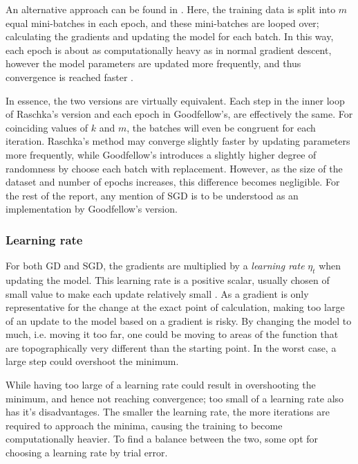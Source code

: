 An alternative approach can be found in \textcite[p. 47]{raschka}.
Here, the training data is split into $m$ equal mini-batches in each epoch, and these mini-batches are looped over; calculating the gradients and updating the model for each batch.
In this way, each epoch is about as computationally heavy as in normal gradient descent, however the model parameters are updated more frequently, and thus convergence is reached faster \citep[p. 47]{raschka}.

In essence, the two versions are virtually equivalent. Each step in the inner loop of Raschka's version and each epoch in Goodfellow's, are effectively the same. For coinciding values of $k$ and $m$, the batches will even be congruent for each iteration. Raschka's method may converge slightly faster by updating parameters more frequently, while Goodfellow's introduces a slightly higher degree of randomness by choose each batch with replacement. However, as the size of the dataset and number of epochs increases, this difference becomes negligible.
For the rest of the report, any mention of SGD is to be understood as an implementation by Goodfellow's version.

\subsubsection{Learning rate}
For both GD and SGD, the gradients are multiplied by a \textit{learning rate} $\eta_t$ when updating the model.
This learning rate is a positive scalar, usually chosen of small value to make each update relatively small \citep[p. 84]{Goodfellow-et-al-2016}.
As a gradient is only representative for the change at the exact point of calculation, making too large of an update to the model based on a gradient is risky. By changing the model to much, i.e. moving it too far, one could be moving to areas of the function that are topographically very different than the starting point. In the worst case, a large step could overshoot the minimum.

While having too large of a learning rate could result in overshooting the minimum, and hence not reaching convergence; too small of a learning rate also has it's disadvantages. 
The smaller the learning rate, the more iterations are required to approach the minima, causing the training to become computationally heavier. To find a balance between the two, some opt for choosing a learning rate by trial error.

